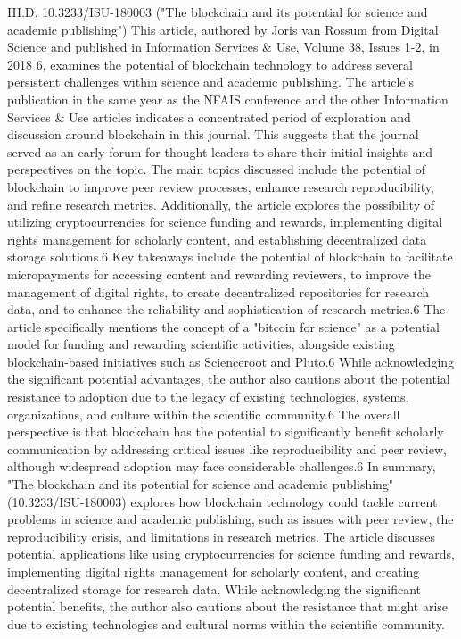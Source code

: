\documentclass{article}
\begin{document}
III.D. 10.3233/ISU-180003 ("The blockchain and its potential for science and academic publishing")
This article, authored by Joris van Rossum from Digital Science and published in Information Services & Use, Volume 38, Issues 1-2, in 2018 6, examines the potential of blockchain technology to address several persistent challenges within science and academic publishing. The article's publication in the same year as the NFAIS conference and the other Information Services & Use articles indicates a concentrated period of exploration and discussion around blockchain in this journal. This suggests that the journal served as an early forum for thought leaders to share their initial insights and perspectives on the topic. The main topics discussed include the potential of blockchain to improve peer review processes, enhance research reproducibility, and refine research metrics. Additionally, the article explores the possibility of utilizing cryptocurrencies for science funding and rewards, implementing digital rights management for scholarly content, and establishing decentralized data storage solutions.6 Key takeaways include the potential of blockchain to facilitate micropayments for accessing content and rewarding reviewers, to improve the management of digital rights, to create decentralized repositories for research data, and to enhance the reliability and sophistication of research metrics.6 The article specifically mentions the concept of a "bitcoin for science" as a potential model for funding and rewarding scientific activities, alongside existing blockchain-based initiatives such as Scienceroot and Pluto.6 While acknowledging the significant potential advantages, the author also cautions about the potential resistance to adoption due to the legacy of existing technologies, systems, organizations, and culture within the scientific community.6 The overall perspective is that blockchain has the potential to significantly benefit scholarly communication by addressing critical issues like reproducibility and peer review, although widespread adoption may face considerable challenges.6
In summary, "The blockchain and its potential for science and academic publishing" (10.3233/ISU-180003) explores how blockchain technology could tackle current problems in science and academic publishing, such as issues with peer review, the reproducibility crisis, and limitations in research metrics. The article discusses potential applications like using cryptocurrencies for science funding and rewards, implementing digital rights management for scholarly content, and creating decentralized storage for research data. While acknowledging the significant potential benefits, the author also cautions about the resistance that might arise due to existing technologies and cultural norms within the scientific community.
\end{document}
